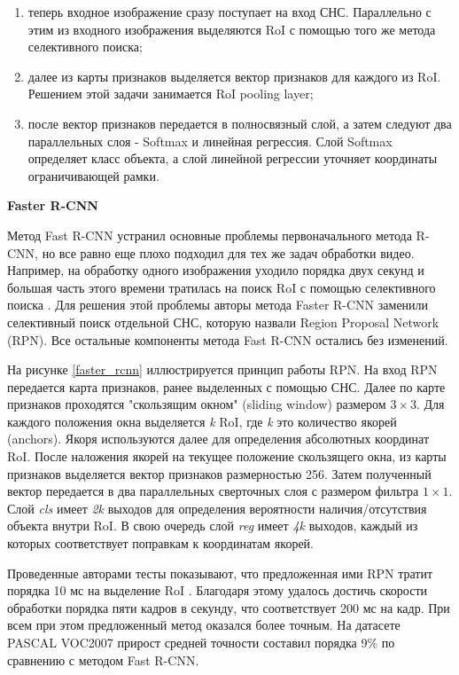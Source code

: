 
\begin{enumerate}
\item теперь входное изображение сразу поступает на вход СНС. Параллельно с этим из входного изображения выделяются RoI 
с помощью того же метода селективного поиска;
\item далее из карты признаков выделяется вектор признаков для каждого из RoI. Решением этой задачи 
занимается RoI pooling layer;
\item после вектор признаков передается в полносвязный слой, а затем следуют два параллельных слоя - Softmax и линейная регрессия.
Слой Softmax определяет класс объекта, а слой линейной регрессии уточняет координаты ограничивающей рамки.
\end{enumerate}

\textbf{Faster R-CNN}

Метод Fast R-CNN устранил основные проблемы первоначального метода R-CNN, но все равно еще плохо подходил для тех же задач 
обработки видео. Например, на обработку одного изображения уходило порядка двух секунд и большая часть этого времени тратилась 
на поиск RoI с помощью селективного поиска \cite{FASTER_RCNN}. Для решения этой проблемы авторы метода Faster R-CNN 
заменили селективный поиск отдельной СНС, которую назвали Region Proposal Network (RPN). Все остальные компоненты 
метода Fast R-CNN остались без изменений.

На рисунке \ref{faster_rcnn} иллюстрируется принцип работы RPN. На вход RPN передается карта признаков, ранее выделенных
с помощью СНС. Далее по карте признаков проходятся "скользящим окном" (sliding window) размером $3 \times 3$. Для каждого
положения окна выделяется \emph{k} RoI, где \emph{k} это количество якорей (anchors). Якоря используются далее для определения 
абсолютных координат RoI. После наложения якорей на текущее положение скользящего окна, из карты признаков выделяется
вектор признаков размерностью 256. Затем полученный вектор передается в два параллельных сверточных слоя с размером фильтра
$1 \times 1$. Слой \emph{cls} имеет \emph{2k} выходов для определения вероятности наличия/отсутствия объекта внутри RoI.
В свою очередь слой \emph{reg} имеет \emph{4k} выходов, каждый из которых соответствует поправкам к координатам якорей.

Проведенные авторами тесты показывают, что предложенная ими RPN тратит порядка 10 мс на выделение RoI \cite{FASTER_RCNN}. 
Благодаря этому удалось достичь скорости обработки порядка пяти кадров в секунду, что соответствует 200 мс на кадр. При всем 
при этом предложенный метод оказался более точным. На датасете PASCAL VOC2007 прирост средней точности составил 
порядка 9\% по сравнению с методом Fast R-CNN.


